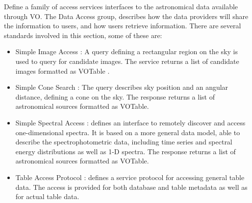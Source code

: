 Define a family of access services interfaces to the astronomical data
available through VO. The Data Access group, describes how the data providers
will share the information to users, and how users retrieve information. There
are several standards involved in this section, some of these are:
\begin{itemize}
	\item Simple Image Access \cite{sia}: A query defining a rectangular
region on the sky is used to query for candidate images. The service returns a
list of candidate images formatted as VOTable \cite{votable}.
	\item Simple Cone Search \cite{scs}: The query describes sky position
and an angular distance, defining a cone on the sky. The response returns a
list of astronomical sources formatted as VOTable.
	\item Simple Spectral Access \cite{ssa}: defines an interface to
remotely discover and access one-dimensional spectra. It is based on a more
general data model, able to describe the spectrophotometric data, including
time series and spectral energy distributions as well as 1-D spectra. The
response returns a list of astronomical sources formatted as VOTable.
	\item Table Access Protocol \cite{tap}: defines a service protocol for
accessing general table data. The access is provided for both database and
table metadata as well as for actual table data.
\end{itemize}
